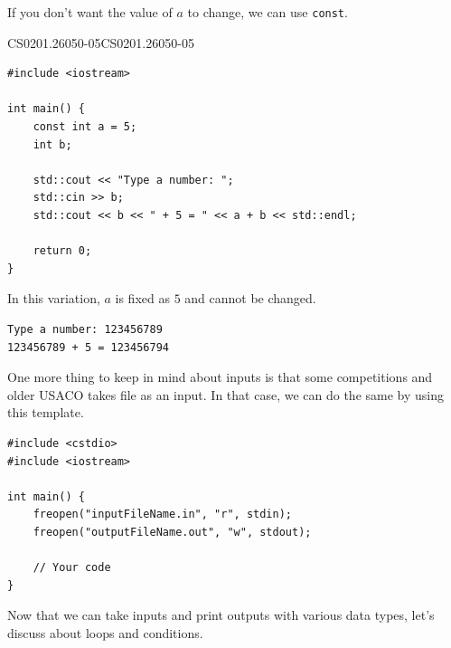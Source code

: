 \documentclass[../../../main.tex]{subfiles}
\begin{document}
If you don't want the value of $a$ to change, we can use \verb|const|.

\begin{cppbox}{CS0201.26050-05}{CS0201.26050-05}
\begin{lstlisting}[style=cppstyle]
#include <iostream>

int main() {
    const int a = 5;
    int b;

    std::cout << "Type a number: ";
    std::cin >> b;
    std::cout << b << " + 5 = " << a + b << std::endl;
    
    return 0;
}
\end{lstlisting}
\end{cppbox}

In this variation, $a$ is fixed as $5$ and cannot be changed.

\begin{outputbox}
\begin{lstlisting}[style=basic]
Type a number: 123456789
123456789 + 5 = 123456794
\end{lstlisting}
\end{outputbox}

One more thing to keep in mind about inputs is that some competitions
and older USACO takes file as an input. In that case, we can do the
same by using this template.

\begin{basicbox}
\begin{lstlisting}[style=cppstyle]
#include <cstdio>
#include <iostream>

int main() {
    freopen("inputFileName.in", "r", stdin);
    freopen("outputFileName.out", "w", stdout);

    // Your code
}
\end{lstlisting}
\end{basicbox}

Now that we can take inputs and print outputs with various data types,
let's discuss about loops and conditions.
\end{document}
